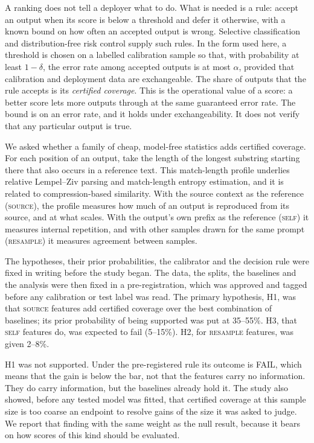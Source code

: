 \documentclass[11pt]{article}
\newcommand{\arm}[1]{\textsc{#1}}
\begin{document}
A ranking does not tell a deployer what to do. What is needed is a rule: accept an output when its score is below a threshold and defer it otherwise, with a known bound on how often an accepted output is wrong. Selective classification\cite{geifman} and distribution-free risk control\cite{ltt} supply such rules. In the form used here\cite{mcelveen}, a threshold is chosen on a labelled calibration sample so that, with probability at least $1-\delta$, the error rate among accepted outputs is at most $\alpha$, provided that calibration and deployment data are exchangeable. The share of outputs that the rule accepts is its \emph{certified coverage}. This is the operational value of a score: a better score lets more outputs through at the same guaranteed error rate. The bound is on an error rate, and it holds under exchangeability. It does not verify that any particular output is true.

We asked whether a family of cheap, model-free statistics adds certified coverage. For each position of an output, take the length of the longest substring starting there that also occurs in a reference text. This match-length profile underlies relative Lempel--Ziv parsing\cite{zivmerhav,barnfield} and match-length entropy estimation\cite{kontoyiannis}, and it is related to compression-based similarity\cite{ncd}. With the source context as the reference (\arm{source}), the profile measures how much of an output is reproduced from its source, and at what scales. With the output's own prefix as the reference (\arm{self}) it measures internal repetition, and with other samples drawn for the same prompt (\arm{resample}) it measures agreement between samples.

The hypotheses, their prior probabilities, the calibrator and the decision rule were fixed in writing before the study began. The data, the splits, the baselines and the analysis were then fixed in a pre-registration, which was approved and tagged before any calibration or test label was read. The primary hypothesis, H1, was that \arm{source} features add certified coverage over the best combination of baselines; its prior probability of being supported was put at 35--55\%. H3, that \arm{self} features do, was expected to fail (5--15\%). H2, for \arm{resample} features, was given 2--8\%.

H1 was not supported. Under the pre-registered rule its outcome is FAIL, which means that the gain is below the bar, not that the features carry no information. They do carry information, but the baselines already hold it. The study also showed, before any tested model was fitted, that certified coverage at this sample size is too coarse an endpoint to resolve gains of the size it was asked to judge. We report that finding with the same weight as the null result, because it bears on how scores of this kind should be evaluated.
\end{document}
